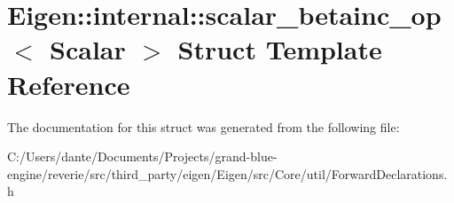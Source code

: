 \hypertarget{struct_eigen_1_1internal_1_1scalar__betainc__op}{}\section{Eigen\+::internal\+::scalar\+\_\+betainc\+\_\+op$<$ Scalar $>$ Struct Template Reference}
\label{struct_eigen_1_1internal_1_1scalar__betainc__op}


The documentation for this struct was generated from the following file\+:\begin{DoxyCompactItemize}
\item 
C\+:/\+Users/dante/\+Documents/\+Projects/grand-\/blue-\/engine/reverie/src/third\+\_\+party/eigen/\+Eigen/src/\+Core/util/Forward\+Declarations.\+h\end{DoxyCompactItemize}
